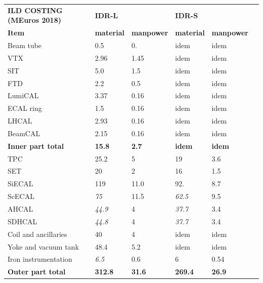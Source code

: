 \begin{table}[h!]\hspace*{-0cm}\small
\begin{tabular}{ l p{0.15\hsize}p{0.15\hsize}p{0.15\hsize} p{0.15\hsize}p{0.15\hsize}}
\toprule
\bf {ILD COSTING (MEuros 2018)}& \bf {IDR-L} & \bf              &  \bf {IDR-S}&\bf \\
\bf {Item}      & \bf material & \bf manpower &  \bf material &\bf manpower \\
\midrule
Beam tube & 0.5 &  0.& idem&idem \\
VTX        & 2.96  &1.45  &  idem &idem \\
SIT        & 5.0   &1.5 & idem&idem\\
FTD       & 2.2   &0.5  & idem &idem  \\
LumiCAL & 3.37  & 0.16& idem&idem\\
ECAL ring & 1.5 & 0.16 & idem&idem\\
LHCAL   & 2.93  & 0.16&idem& idem\\
BeamCAL & 2.15  & 0.16& idem&idem\\
\bf{Inner part total} &\bf{15.8}&\bf{2.7}&\bf{idem}&\bf{idem}\\
\midrule
TPC & 25.2 & 5 & 19 & 3.6\\
SET    & 20& 2&16&1.5\\
SiECAL & 119 & 11.0 & 92. & 8.7\\
ScECAL & \it75 & 11.5 & \it62.5 & 9.5\\
AHCAL  & \it44.9 & 4 & \it37.7 & 3.4\\
SDHCAL & \it44.8 & 4 & \it37.7 & 3.4\\
Coil and ancillaries &  40 & 4& idem & idem\\
Yoke and vacuum tank &  48.4 & 5.2& idem & idem \\
Iron instrumentation  &  \it6.5 & 0.6 & 6 & 0.54\\
\bf{Outer part total}&\bf{312.8}&\bf{31.6}&\bf{269.4}&\bf{26.9}\\
\midrule

\end{tabular}
\end{table}
